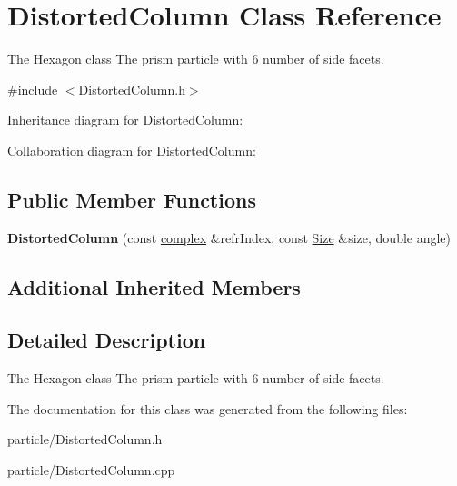 \hypertarget{class_distorted_column}{}\section{Distorted\+Column Class Reference}
\label{class_distorted_column}


The Hexagon class The prism particle with 6 number of side facets.  




{\ttfamily \#include $<$Distorted\+Column.\+h$>$}



Inheritance diagram for Distorted\+Column\+:


Collaboration diagram for Distorted\+Column\+:
\subsection*{Public Member Functions}
\begin{DoxyCompactItemize}
\item 
\mbox{\label{class_distorted_column_a7cc0f6c72403bd2de255297fccbbf92c}} 
{\bfseries Distorted\+Column} (const \mbox{\hyperlink{classcomplex}{complex}} \&refr\+Index, const \mbox{\hyperlink{struct_size}{Size}} \&size, double angle)
\end{DoxyCompactItemize}
\subsection*{Additional Inherited Members}


\subsection{Detailed Description}
The Hexagon class The prism particle with 6 number of side facets. 

The documentation for this class was generated from the following files\+:\begin{DoxyCompactItemize}
\item 
particle/Distorted\+Column.\+h\item 
particle/Distorted\+Column.\+cpp\end{DoxyCompactItemize}
